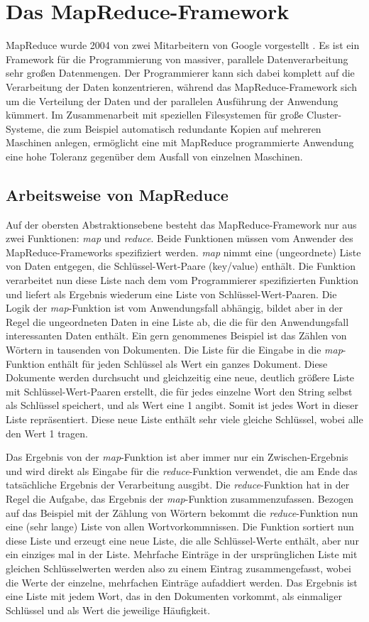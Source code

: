 \chapter{Das MapReduce-Framework}
MapReduce wurde 2004 von zwei Mitarbeitern von Google vorgestellt \cite{dean2008mapreduce}. Es ist ein Framework
für die Programmierung von massiver, parallele Datenverarbeitung sehr großen Datenmengen. Der Programmierer
kann sich dabei komplett auf die Verarbeitung der Daten konzentrieren, während das MapReduce-Framework sich um die
Verteilung der Daten und der parallelen Ausführung der Anwendung kümmert. Im Zusammenarbeit mit speziellen Filesystemen 
für große Cluster-Systeme, die zum Beispiel automatisch redundante Kopien auf mehreren Maschinen anlegen, ermöglicht
eine mit MapReduce programmierte Anwendung eine hohe Toleranz gegenüber dem Ausfall von einzelnen Maschinen.

\section{Arbeitsweise von MapReduce}
Auf der obersten Abstraktionsebene besteht das MapReduce-Framework nur aus zwei Funktionen: \textit{map} und \textit{reduce}.
Beide Funktionen müssen vom Anwender des MapReduce-Frameworks spezifiziert werden.
\textit{map} nimmt eine (ungeordnete) Liste von Daten entgegen, die Schlüssel-Wert-Paare (key/value) enthält. Die Funktion 
verarbeitet nun diese Liste nach dem vom Programmierer spezifizierten Funktion und liefert als Ergebnis wiederum eine
Liste von Schlüssel-Wert-Paaren. Die Logik der \textit{map}-Funktion ist vom Anwendungsfall abhängig, bildet aber in der Regel
die ungeordneten Daten in eine Liste ab, die die für den Anwendungsfall interessanten Daten enthält. Ein gern genommenes Beispiel
ist das Zählen von Wörtern in tausenden von Dokumenten. Die Liste für die Eingabe in die \textit{map}-Funktion enthält für jeden Schlüssel
als Wert ein ganzes Dokument. Diese Dokumente werden durchsucht und gleichzeitig eine neue, deutlich größere Liste mit Schlüssel-Wert-Paaren erstellt, 
die für jedes einzelne Wort den String selbst als Schlüssel speichert, und als Wert eine 1 angibt. Somit ist jedes Wort in dieser Liste repräsentiert.
Diese neue Liste enthält sehr viele gleiche Schlüssel, wobei alle den Wert 1 tragen.

Das Ergebnis von der \textit{map}-Funktion ist aber immer nur ein Zwischen-Ergebnis und wird direkt als Eingabe für die \textit{reduce}-Funktion verwendet,
die am Ende das tatsächliche Ergebnis der Verarbeitung ausgibt. Die \textit{reduce}-Funktion hat in der Regel die Aufgabe, das Ergebnis der \textit{map}-Funktion
zusammenzufassen. Bezogen auf das Beispiel mit der Zählung von Wörtern bekommt die \textit{reduce}-Funktion nun eine (sehr lange) Liste von allen Wortvorkommnissen.
Die Funktion sortiert  nun diese Liste und erzeugt eine neue Liste, die alle Schlüssel-Werte enthält, aber nur ein einziges mal in der Liste. Mehrfache Einträge
in der ursprünglichen Liste mit gleichen Schlüsselwerten werden also zu einem Eintrag zusammengefasst, wobei die Werte der einzelne, mehrfachen Einträge
aufaddiert werden. Das Ergebnis ist eine Liste mit jedem Wort, das in den Dokumenten vorkommt, als einmaliger Schlüssel und als Wert die jeweilige Häufigkeit.


